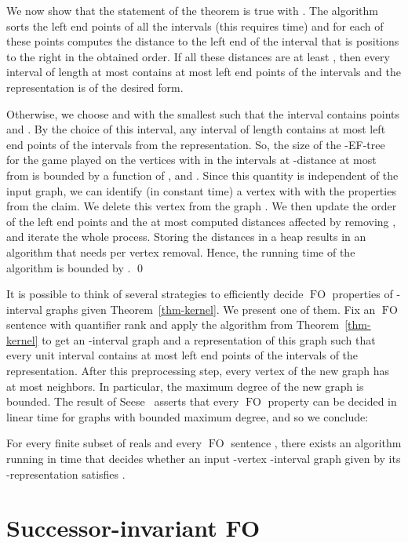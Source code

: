 \documentclass{CSML}
\newcommand{\FO}{\ensuremath{\operatorname{FO}}\xspace}
\theoremstyle{plain}\newtheorem{claim}[thm]{Claim}
\begin{document}
We now show that the statement of the theorem is true with .
The algorithm sorts the left end points of all the intervals (this requires  time) and
for each of these points computes the distance to the left end of the interval 
that is  positions to the right in the obtained order.
If all these distances are at least ,
then every interval of length at most  contains at most  left end points of
the intervals and the representation is of the desired form.

Otherwise, we choose  and  with the smallest  such that the interval  contains  points and .
By the choice of this interval, any interval of length 
contains at most  left end points of the intervals from the representation.
So, the size of the -EF-tree for the game played on the vertices  with  in the intervals at -distance at most 
from  is bounded by a function of ,  and .
Since this quantity is independent of the input graph, we can identify (in constant time) a vertex  with 
with the properties from the claim. We delete this vertex from the graph .
We then update the order of the left end points and the at most  computed distances affected by removing , and
iterate the whole process.
Storing the distances in a heap results in an algorithm that needs  per vertex removal.
Hence, the running time of the algorithm is bounded by .
\qed

It is possible to think of several strategies to efficiently decide \FO properties of -interval graphs
given Theorem~\ref{thm-kernel}.
We present one of them.
Fix an \FO sentence  with quantifier rank  and
apply the algorithm from Theorem~\ref{thm-kernel} to get an -interval graph
and a representation of this graph such that every unit interval contains at most
 left end points of the intervals of
the representation. After this preprocessing step, every vertex of the new graph
has at most  neighbors. 
In particular, the maximum degree of the new graph is bounded.
The result of Seese~\cite{see96} asserts that every \FO property can be decided in linear time for graphs with bounded maximum degree, and so we conclude:

\begin{thm}
\label{thm-L-interval}
For every finite subset  of reals and every \FO sentence , there exists an algorithm
running in time  that decides whether an input -vertex -interval graph 
given by its -representation satisfies .
\end{thm}


\section{Successor-invariant FO}
\label{sec:succinvar}
\end{document}
